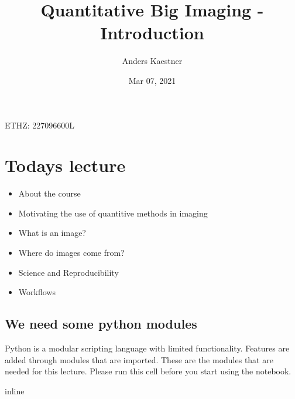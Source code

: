 \documentclass[letterpaper,10pt,english]{sphinxmanual}
\title{Quantitative Big Imaging - Introduction}
\date{Mar 07, 2021}
\author{Anders Kaestner}
\begin{document}
\pagestyle{empty}
\sphinxmaketitle
\pagestyle{plain}
\sphinxtableofcontents
\pagestyle{normal}
\label{\detokenize{01-Introduction::doc}}


\sphinxAtStartPar
{} ETHZ: 227\sphinxhyphen{}0966\sphinxhyphen{}00L




\chapter{Todays lecture}
\label{\detokenize{01-Introduction:todays-lecture}}\begin{itemize}
\item {} 
\sphinxAtStartPar
About the course

\item {} 
\sphinxAtStartPar
Motivating the use of quantitive methods in imaging

\item {} 
\sphinxAtStartPar
What is an image?

\item {} 
\sphinxAtStartPar
Where do images come from?

\item {} 
\sphinxAtStartPar
Science and Reproducibility

\item {} 
\sphinxAtStartPar
Workflows

\end{itemize}


\section{We need some python modules}
\label{\detokenize{01-Introduction:we-need-some-python-modules}}
\sphinxAtStartPar
Python is a modular scripting language with limited functionality. Features are added through modules that are imported.
These are the modules that are needed for this lecture. Please run this cell before you start using the notebook.

\begin{sphinxVerbatim}[commandchars=\\\{\}]
   
   
   
 inline

   
   
   
   
   
 
   
\end{sphinxVerbatim}
\end{document}
